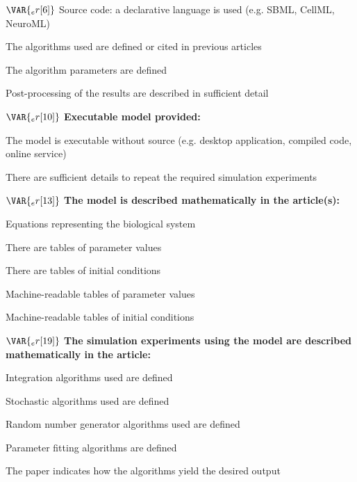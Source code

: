 \documentclass{article}
\begin{document}
\begin{tcolorbox}
\begin{todolist}
  \item[$\VAR{_er[6]}$] Source code: a declarative language is used (e.g. SBML, CellML, NeuroML)
  \begin{todolist}
    \item[\VAR{_er[7]}] The algorithms used are defined or cited in previous articles
    \item[\VAR{_er[8]}] The algorithm parameters are defined
    \item[\VAR{_er[9]}] Post-processing of the results are described in sufficient detail
  \end{todolist}
\end{todolist}
$\VAR{_er[10]}$ \textbf{Executable model provided:}
\begin{todolist}
    \item[\VAR{_er[11]}] The model is executable without source (e.g. desktop application, compiled code, online service)
    \begin{todolist}
        \item[\VAR{_er[12]}] There are sufficient details to repeat the required simulation experiments
    \end{todolist}
\end{todolist}
$\VAR{_er[13]}$ \textbf{The model is described mathematically in the article(s):}
\begin{todolist}
    \item[\VAR{_er[14]}] Equations representing the biological system
    \item[\VAR{_er[15]}] There are tables of parameter values
    \item[\VAR{_er[16]}] There are tables of initial conditions
    \item[\VAR{_er[17]}] Machine-readable tables of parameter values
    \item[\VAR{_er[18]}] Machine-readable tables of initial conditions
\end{todolist}
$\VAR{_er[19]}$ \textbf{The simulation experiments using the model are described mathematically in the article:}
\begin{todolist}
    \item[\VAR{_er[20]}] Integration algorithms used are defined
    \item[\VAR{_er[21]}] Stochastic algorithms used are defined
    \item[\VAR{_er[22]}] Random number generator algorithms used are defined
    \item[\VAR{_er[23]}] Parameter fitting algorithms are defined
    \item[\VAR{_er[24]}] The paper indicates how the algorithms yield the desired output
\end{todolist}
\end{tcolorbox}
\end{document}
